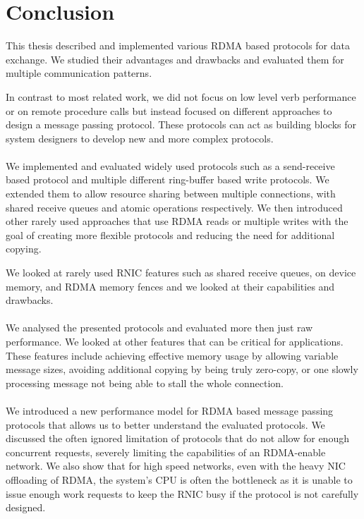 \section{Conclusion}

This thesis described and implemented various RDMA based protocols for data exchange. We studied their advantages and 
drawbacks and evaluated them for multiple communication patterns.

In contrast to most related work, we did not focus on low level verb performance or on remote procedure calls but instead 
focused on different approaches to design a message passing protocol. These protocols can act as building blocks for 
system designers to develop new and more complex protocols.

\paragraph{} We implemented and evaluated widely used protocols such as a send-receive based protocol and multiple different
ring-buffer based write protocols. We extended them to allow resource sharing between multiple connections, with shared 
receive queues and atomic operations respectively. We then introduced other rarely used approaches that use RDMA reads or 
multiple writes with the goal of creating more flexible protocols and reducing the need for additional copying.

We looked at rarely used RNIC features such as shared receive queues, on device memory, and RDMA memory fences and we looked
at their capabilities and drawbacks.


\paragraph{} We analysed the presented protocols and evaluated more then just raw performance. We looked at other
features that can be critical for applications.  These features include achieving effective memory usage by allowing 
variable message sizes, avoiding additional copying by being truly zero-copy, or one slowly processing message not
being able to stall the whole connection.

\paragraph{} We introduced a new performance model for RDMA based message passing protocols that allows us to 
better understand the evaluated protocols. We discussed the often ignored limitation of protocols that do not allow for enough
concurrent requests, severely limiting the capabilities of an RDMA-enable network. We also show that for high speed networks,
even with the heavy NIC offloading of RDMA, the system's CPU is often the bottleneck as it is unable to issue enough work requests to
keep the RNIC busy if the protocol is not carefully designed.


